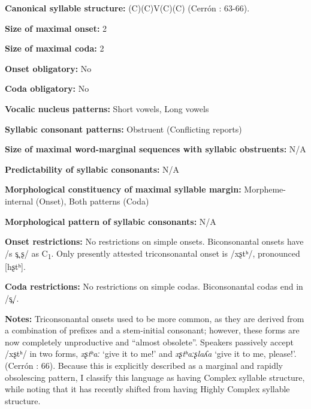 \textbf{Canonical syllable structure:} (C)(C)V(C)(C) (Cerrón \citealt{Palomino2006}: 63-66).



\textbf{Size of maximal onset:} 2



\textbf{Size of maximal coda:} 2



\textbf{Onset obligatory:} No



\textbf{Coda obligatory:} No



\textbf{Vocalic nucleus patterns:} Short vowels, Long vowels



\textbf{Syllabic consonant patterns:} Obstruent (Conflicting reports)



\textbf{Size of maximal word{}-marginal sequences with syllabic obstruents:} N/A



\textbf{Predictability of syllabic consonants:} N/A



\textbf{Morphological constituency of maximal syllable margin:} Morpheme-internal (Onset), Both patterns (Coda)



\textbf{Morphological pattern of syllabic consonants:} N/A



\textbf{Onset restrictions:} No restrictions on simple onsets. Biconsonantal onsets have /s s̪ ʂ/ as C\textsubscript{1}. Only presently attested triconsonantal onset is /xʂtʰ/, pronounced [hʂtʰ].



\textbf{Coda restrictions:} No restrictions on simple codas. Biconsonantal codas end in /s̪/.



\textbf{Notes:} Triconsonantal onsets used to be more common, as they are derived from a combination of prefixes and a stem-initial consonant; however, these forms are now completely unproductive and “almost obsolete”. Speakers passively accept /xʂtʰ/ in two forms, \textit{xʂtʰaː} ‘give it to me!’ and \textit{xʂtʰaːʂlaʎa} ‘give it to me, please!’. (Cerrón \citealt{Palomino2006}: 66). Because this is explicitly described as a marginal and rapidly obsolescing pattern, I classify this language as having Complex syllable structure, while noting that it has recently shifted from having Highly Complex syllable structure.



